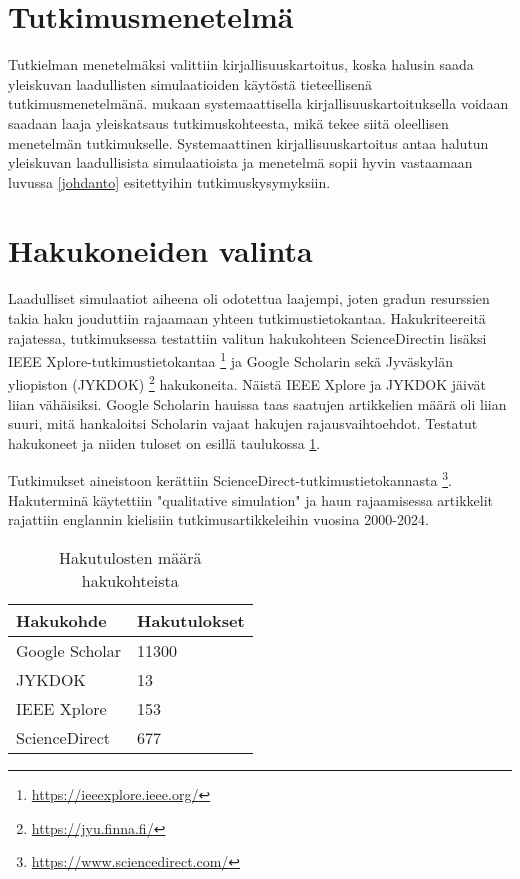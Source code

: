 \documentclass[utf8]{gradu3}
\begin{document}
\section{Tutkimusmenetelmä} \label{tutkimusmenetelmä}
Tutkielman menetelmäksi valittiin kirjallisuuskartoitus, koska halusin saada yleiskuvan laadullisten simulaatioiden käytöstä tieteellisenä tutkimusmenetelmänä. \cite{keele2007guidelines} mukaan systemaattisella kirjallisuuskartoituksella voidaan saadaan laaja yleiskatsaus tutkimuskohteesta, mikä tekee siitä oleellisen menetelmän tutkimukselle. Systemaattinen kirjallisuuskartoitus antaa halutun yleiskuvan laadullisista simulaatioista ja menetelmä sopii hyvin vastaamaan luvussa \ref{johdanto} esitettyihin tutkimuskysymyksiin.


\section{Hakukoneiden valinta} \label{hakukoneiden valinta}
Laadulliset simulaatiot aiheena oli odotettua laajempi, joten gradun resurssien takia haku jouduttiin rajaamaan yhteen tutkimustietokantaa. Hakukriteereitä rajatessa, tutkimuksessa testattiin valitun hakukohteen ScienceDirectin lisäksi IEEE Xplore-tutkimustietokantaa \footnote{\url{https://ieeexplore.ieee.org/}} ja Google Scholarin sekä Jyväskylän yliopiston (JYKDOK) \footnote{\url{https://jyu.finna.fi/}} hakukoneita. Näistä IEEE Xplore ja JYKDOK jäivät liian vähäisiksi. Google Scholarin hauissa taas saatujen artikkelien määrä oli liian suuri, mitä hankaloitsi Scholarin vajaat hakujen rajausvaihtoehdot. Testatut hakukoneet ja niiden tuloset on esillä taulukossa \ref{table: hakutulokset}.

Tutkimukset aineistoon kerättiin ScienceDirect-tutkimustietokannasta \footnote{\url{https://www.sciencedirect.com/}}. Hakuterminä käytettiin "qualitative simulation" ja haun rajaamisessa artikkelit rajattiin englannin kielisiin tutkimusartikkeleihin vuosina 2000-2024. 

\begin{table}[]
\centering
\begin{tabular}{|l|l|}
\hline
\textbf{Hakukohde} & \textbf{Hakutulokset} \\ \hline
Google Scholar     & 11300                 \\ \hline
JYKDOK             & 13                    \\ \hline
IEEE Xplore        & 153                   \\ \hline
ScienceDirect      & 677                   \\ \hline
\end{tabular}
\caption{Hakutulosten määrä hakukohteista}
\label{table: hakutulokset}
\end{table}
\end{document}
